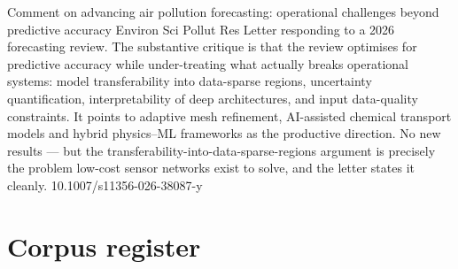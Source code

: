 \documentclass[10pt]{article}
\begin{document}

{Comment on advancing air pollution forecasting: operational challenges beyond predictive accuracy}
{Environ Sci Pollut Res}
{Letter responding to a 2026 forecasting review. The substantive critique is that the
review optimises for predictive accuracy while under-treating what actually breaks
operational systems: model transferability into data-sparse regions, uncertainty
quantification, interpretability of deep architectures, and input data-quality
constraints. It points to adaptive mesh refinement, AI-assisted chemical transport models
and hybrid physics--ML frameworks as the productive direction. No new results --- but the
transferability-into-data-sparse-regions argument is precisely the problem low-cost
sensor networks exist to solve, and the letter states it cleanly.}
{10.1007/s11356-026-38087-y}

\clearpage

\section*{\sffamily\bfseries\color{Deep}Corpus register}
\vspace{-1.5mm}{\color{Amber}\rule{\linewidth}{1.1pt}}\vspace{2.5mm}


\end{document}
